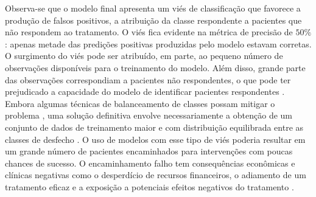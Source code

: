 Observa-se que o modelo final apresenta um viés de classificação que favorece a produção de falsos positivos, a atribuição da classe respondente a pacientes que não respondem ao tratamento. O viés fica evidente
na métrica de precisão de $50\%$: apenas metade das predições positivas produzidas pelo modelo estavam corretas. O surgimento do viés pode ser atribuído, em parte, ao pequeno número de observações disponíveis para
o treinamento do modelo. Além disso, grande parte das observações correspondiam a pacientes não respondentes, o que pode ter prejudicado a capacidade do modelo de identificar pacientes respondentes \cite{Delgadillo2020}.
Embora algumas técnicas de balanceamento de classes possam mitigar o problema \cite{Bi2019}, uma solução definitiva envolve necessariamente a obtenção de um conjunto de dados de treinamento maior e com distribuição
equilibrada entre as classes de desfecho \cite{Delgadillo2020}. O uso de modelos com esse tipo de viés poderia resultar em um grande número de pacientes encaminhados para intervenções com poucas chances de sucesso. O
encaminhamento falho tem consequências econômicas e clínicas negativas como o desperdício de recursos financeiros, o adiamento de um tratamento eficaz e a exposição a potenciais efeitos negativos do tratamento \cite{John2009}. 
